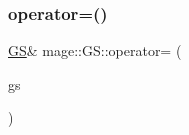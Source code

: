 \hypertarget{structmage_1_1_g_s_a699e95852119b0e3f73ad4fbbac26332}{}\label{structmage_1_1_g_s_a699e95852119b0e3f73ad4fbbac26332} 
\subsubsection{\texorpdfstring{operator=()}{operator=()}\hspace{0.1cm}{\footnotesize\ttfamily [2/2]}}
{\footnotesize\ttfamily \hyperlink{structmage_1_1_g_s}{GS}\& mage\+::\+G\+S\+::operator= (\begin{DoxyParamCaption}\item[{\hyperlink{structmage_1_1_g_s}{GS} \&\&}]{gs }\end{DoxyParamCaption})\hspace{0.3cm}{\ttfamily [delete]}}

